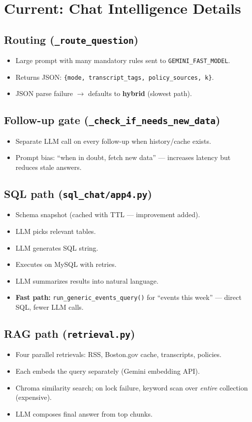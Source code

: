 \documentclass[11pt,a4paper]{article}
\begin{document}
\section{Current: Chat Intelligence Details}

\subsection{Routing (\texttt{\_route\_question})}
\begin{itemize}
  \item Large prompt with many mandatory rules sent to \texttt{GEMINI\_FAST\_MODEL}.
  \item Returns JSON: \texttt{\{mode, transcript\_tags, policy\_sources, k\}}.
  \item JSON parse failure $\rightarrow$ defaults to \textbf{hybrid} (slowest path).
\end{itemize}

\subsection{Follow-up gate (\texttt{\_check\_if\_needs\_new\_data})}
\begin{itemize}
  \item Separate LLM call on every follow-up when history/cache exists.
  \item Prompt bias: ``when in doubt, fetch new data'' --- increases latency but reduces stale answers.
\end{itemize}

\subsection{SQL path (\texttt{sql\_chat/app4.py})}
\begin{itemize}
  \item Schema snapshot (cached with TTL --- improvement added).
  \item LLM picks relevant tables.
  \item LLM generates SQL string.
  \item Executes on MySQL with retries.
  \item LLM summarizes results into natural language.
  \item \textbf{Fast path:} \texttt{run\_generic\_events\_query()} for ``events this week'' --- direct SQL, fewer LLM calls.
\end{itemize}

\subsection{RAG path (\texttt{retrieval.py})}
\begin{itemize}
  \item Four parallel retrievals: RSS, Boston.gov cache, transcripts, policies.
  \item Each embeds the query separately (Gemini embedding API).
  \item Chroma similarity search; on lock failure, keyword scan over \emph{entire} collection (expensive).
  \item LLM composes final answer from top chunks.
\end{itemize}
\end{document}
